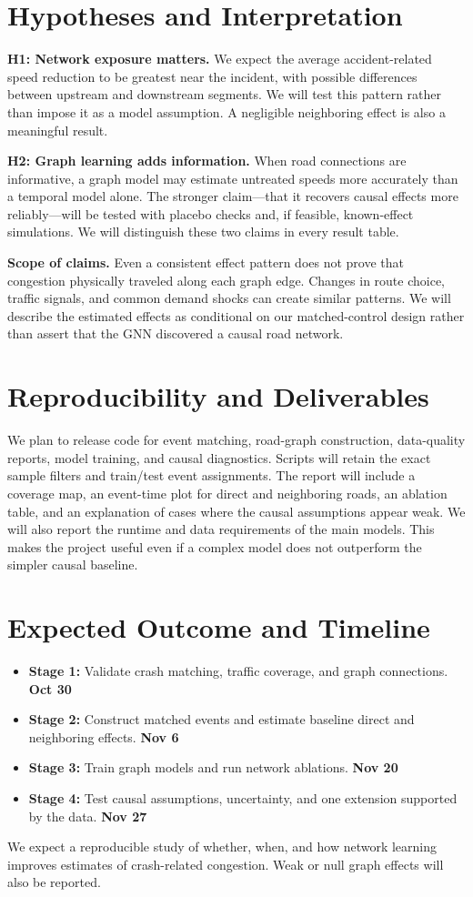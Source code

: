 \documentclass[sigconf,nonacm]{acmart}
\begin{document}
\section{Hypotheses and Interpretation}
\textbf{H1: Network exposure matters.} We expect the average accident-related speed reduction to be greatest near the incident, with possible differences between upstream and downstream segments. We will test this pattern rather than impose it as a model assumption. A negligible neighboring effect is also a meaningful result.

\textbf{H2: Graph learning adds information.} When road connections are informative, a graph model may estimate untreated speeds more accurately than a temporal model alone. The stronger claim---that it recovers causal effects more reliably---will be tested with placebo checks and, if feasible, known-effect simulations. We will distinguish these two claims in every result table.

\textbf{Scope of claims.} Even a consistent effect pattern does not prove that congestion physically traveled along each graph edge. Changes in route choice, traffic signals, and common demand shocks can create similar patterns. We will describe the estimated effects as conditional on our matched-control design rather than assert that the GNN discovered a causal road network.

\section{Reproducibility and Deliverables}
We plan to release code for event matching, road-graph construction, data-quality reports, model training, and causal diagnostics. Scripts will retain the exact sample filters and train/test event assignments. The report will include a coverage map, an event-time plot for direct and neighboring roads, an ablation table, and an explanation of cases where the causal assumptions appear weak. We will also report the runtime and data requirements of the main models. This makes the project useful even if a complex model does not outperform the simpler causal baseline.

\section{Expected Outcome and Timeline}
\begin{itemize}
    \item \textbf{Stage 1:} Validate crash matching, traffic coverage, and graph connections. 
    \newline \textbf{Oct 30}
    \item \textbf{Stage 2:} Construct matched events and estimate baseline direct and neighboring effects.
    \newline \textbf{Nov 6}
    \item \textbf{Stage 3:} Train graph models and run network ablations. 
    \newline \textbf{Nov 20}
    \item \textbf{Stage 4:} Test causal assumptions, uncertainty, and one extension supported by the data.
    \newline \textbf{Nov 27}
\end{itemize}

We expect a reproducible study of whether, when, and how network learning improves estimates of crash-related congestion. Weak or null graph effects will also be reported.



\end{document}
